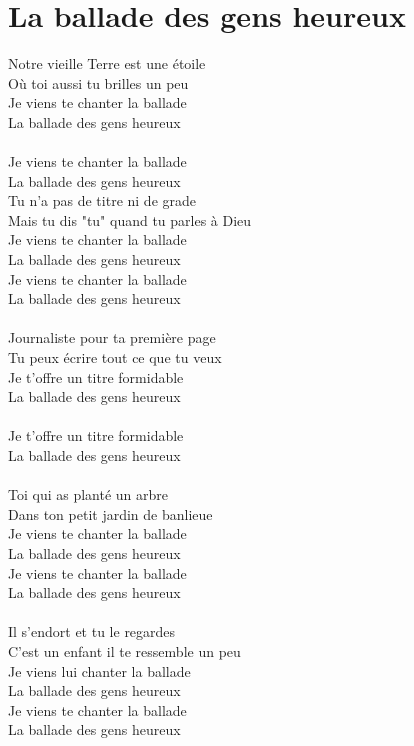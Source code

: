 \section*{La ballade des gens heureux}
Notre vieille Terre est une étoile\\
Où toi aussi tu brilles un peu\\
Je viens te chanter la ballade\\
La ballade des gens heureux\\\\
Je viens te chanter la ballade\\
La ballade des gens heureux\\
Tu n'a pas de titre ni de grade\\
Mais tu dis "tu" quand tu parles à Dieu\\
Je viens te chanter la ballade\\
La ballade des gens heureux\\
Je viens te chanter la ballade\\
La ballade des gens heureux\\\\
Journaliste pour ta première page\\
Tu peux écrire tout ce que tu veux\\
Je t'offre un titre formidable\\
La ballade des gens heureux\\\\
Je t'offre un titre formidable\\
La ballade des gens heureux\\\\
Toi qui as planté un arbre\\
Dans ton petit jardin de banlieue\\
Je viens te chanter la ballade\\
La ballade des gens heureux\\
Je viens te chanter la ballade\\
La ballade des gens heureux\\\\
Il s'endort et tu le regardes\\
C'est un enfant il te ressemble un peu\\
Je viens lui chanter la ballade\\
La ballade des gens heureux\\
Je viens te chanter la ballade\\
La ballade des gens heureux\\\\
